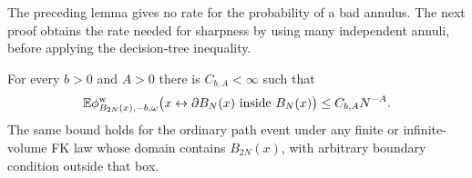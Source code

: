 The preceding lemma gives no rate for the probability of a bad annulus.
The next proof obtains the rate needed for sharpness by using many
independent annuli, before applying the decision-tree inequality.

\begin{lemma}
\label{crit:subcritical-arms}
For every $b>0$ and $A>0$ there is $C_{b,A}<\infty$ such that
\begin{equation}
 \mathbb E\phi_{B_{2N}(x),-b,\omega}^{\mathrm w}
 \bigl(x\leftrightarrow\partial B_N(x)
                \text{ inside }B_N(x)\bigr)
       \le C_{b,A}N^{-A}.
 \label{crit:annealed-arm}
\end{equation}
The same bound holds for the ordinary path event under any finite or
infinite-volume FK law whose domain contains $B_{2N}(x)$, with arbitrary
boundary condition outside that box.
\end{lemma}

